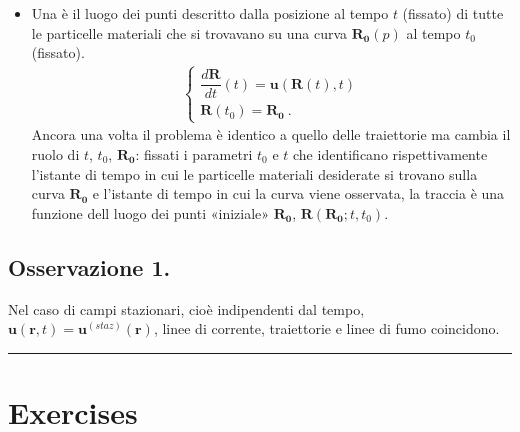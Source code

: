 \documentclass[letterpaper,10pt,italian]{jupyterBook}
\begin{document}
\begin{itemize}
\item {} 
\sphinxAtStartPar
Una  è il luogo dei punti descritto dalla posizione al
tempo \(t\) (fissato) di tutte le particelle materiali che si
trovavano su una curva \(\mathbf{R_0}(p)\) al tempo \(t_0\) (fissato).
\begin{equation*}
\begin{split}\begin{cases}
     \dfrac{d\mathbf{R}}{dt}(t) = \mathbf{u}(\mathbf{R}(t),t) \\
     \mathbf{R}(t_0) = \mathbf{R_0} \ .
    \end{cases}\end{split}
\end{equation*}
\sphinxAtStartPar
Ancora una volta il problema è identico a quello delle
traiettorie ma cambia il ruolo di \(t\), \(t_0\), \(\mathbf{R_0}\): fissati i
parametri \(t_0\) e \(t\) che identificano rispettivamente l’istante di
tempo in cui le particelle materiali desiderate si trovano sulla
curva \(\mathbf{R_0}\) e l’istante di tempo in cui la curva viene
osservata, la traccia è una funzione dell luogo dei punti «iniziale»
\(\mathbf{R_0}\), \(\mathbf{R}(\mathbf{R_0};t,t_0)\).

\end{itemize}


\subsection{Osservazione 1.}
\label{\detokenize{polimi/fluidmechanics-ita/template/capitoli/03_cinematica/12teoria:osservazione-1}}
\sphinxAtStartPar
Nel caso di campi stazionari, cioè indipendenti dal tempo,
\(\mathbf{u}(\mathbf{r},t) = \mathbf{u}^{(staz)}(\mathbf{r})\), linee di corrente,
traiettorie e linee di fumo coincidono.


\bigskip\hrule\bigskip


\sphinxstepscope


\section{Exercises}
\label{\detokenize{polimi/fluidmechanics-ita/template/capitoli/03_cinematica/exercises:exercises}}\label{\detokenize{polimi/fluidmechanics-ita/template/capitoli/03_cinematica/exercises:fluid-mechanics-kinematics-exercises}}\label{\detokenize{polimi/fluidmechanics-ita/template/capitoli/03_cinematica/exercises::doc}}
\sphinxstepscope
\end{document}
